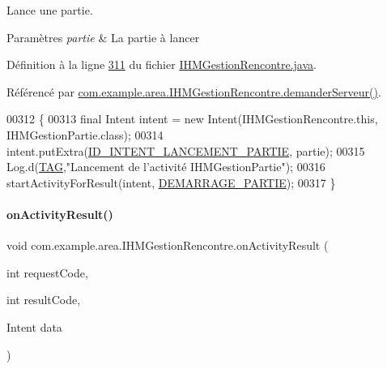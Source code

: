 Lance une partie. 


\begin{DoxyParams}{Paramètres}
{\em partie} & La partie à lancer \\
\hline
\end{DoxyParams}


Définition à la ligne \hyperlink{_i_h_m_gestion_rencontre_8java_source_l00311}{311} du fichier \hyperlink{_i_h_m_gestion_rencontre_8java_source}{I\+H\+M\+Gestion\+Rencontre.\+java}.



Référencé par \hyperlink{_i_h_m_gestion_rencontre_8java_source_l00222}{com.\+example.\+area.\+I\+H\+M\+Gestion\+Rencontre.\+demander\+Serveur()}.


\begin{DoxyCode}
00312     \{
00313         \textcolor{keyword}{final} Intent intent = \textcolor{keyword}{new} Intent(IHMGestionRencontre.this, IHMGestionPartie.class);
00314         intent.putExtra(\hyperlink{classcom_1_1example_1_1area_1_1_i_h_m_gestion_rencontre_a03e10549be0fc3fb5dc146afe8db5e89}{ID\_INTENT\_LANCEMENT\_PARTIE}, partie);
00315         Log.d(\hyperlink{classcom_1_1example_1_1area_1_1_i_h_m_gestion_rencontre_a0ac4d9152d48619cd697c8c69166219f}{TAG},\textcolor{stringliteral}{"Lancement de l'activité IHMGestionPartie"});
00316         startActivityForResult(intent, \hyperlink{classcom_1_1example_1_1area_1_1_i_h_m_gestion_rencontre_a752975e509f051f66f3f06a744807f21}{DEMARRAGE\_PARTIE});
00317     \}
\end{DoxyCode}
\mbox{\label{classcom_1_1example_1_1area_1_1_i_h_m_gestion_rencontre_a2ab13355dbd1751f43ff54c534d0f021}} 
\paragraph{\texorpdfstring{on\+Activity\+Result()}{onActivityResult()}}
{\footnotesize\ttfamily void com.\+example.\+area.\+I\+H\+M\+Gestion\+Rencontre.\+on\+Activity\+Result (\begin{DoxyParamCaption}\item[{int}]{request\+Code,  }\item[{int}]{result\+Code,  }\item[{Intent}]{data }\end{DoxyParamCaption})\hspace{0.3cm}{\ttfamily [protected]}}



